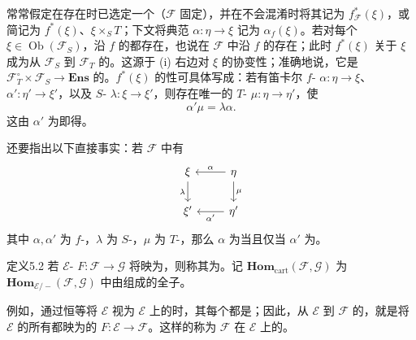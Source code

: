 常常假定在存在时已选定一个（$\mathcal F$ 固定），并在不会混淆时将其记为 $f^*_{\mathcal F}(\xi)$，或简记为 $f^*(\xi)$、$\xi\times_ST$；下文将典范 $\alpha:\eta\to\xi$ 记为 $\alpha_f(\xi)$。若对每个 $\xi\in\operatorname{Ob}(\mathcal F_S)$，沿 $f$ 的都存在，也说在 $\mathcal F$ 中沿 $f$ 的存在；此时 $f^*(\xi)$ 关于 $\xi$ 成为从 $\mathcal F_S$ 到 $\mathcal F_T$ 的。这源于 (i) 右边对 $\xi$ 的协变性；准确地说，它是 $\mathcal F_T^\circ\times\mathcal F_S\to\mathbf{Ens}$ 的。$f^*(\xi)$ 的性可具体写成：若有笛卡尔 $f$- $\alpha:\eta\to\xi$、$\alpha':\eta'\to\xi'$，以及 $S$- $\lambda:\xi\to\xi'$，则存在唯一的 $T$- $\mu:\eta\to\eta'$，使
\[
 \alpha'\mu=\lambda\alpha.
\]
这由 $\alpha'$ 为即得。

还要指出以下直接事实：若 $\mathcal F$ 中有
\[
\begin{tikzcd}
 \xi\arrow[d,"\lambda"']&\eta\arrow[l,"\alpha"']\arrow[d,"\mu"]\\
 \xi'&\eta'\arrow[l,"\alpha'" ]
\end{tikzcd}
\]
其中 $\alpha,\alpha'$ 为 $f$-，$\lambda$ 为 $S$-，$\mu$ 为 $T$-，那么 $\alpha$ 为当且仅当 $\alpha'$ 为。

\begin{SGAresult}{定义}{5.2}
若 $\mathcal E$- $F:\mathcal F\to\mathcal G$ 将映为，则称其为。记 $\mathbf{Hom}_{\mathrm{cart}}(\mathcal F,\mathcal G)$ 为 $\mathbf{Hom}_{\mathcal E/-}(\mathcal F,\mathcal G)$ 中由组成的全子。
\end{SGAresult}
例如，通过恒等将 $\mathcal E$ 视为 $\mathcal E$ 上的时，其每个都是；因此，从 $\mathcal E$ 到 $\mathcal F$ 的，就是将 $\mathcal E$ 的所有都映为的 $F:\mathcal E\to\mathcal F$。这样的称为 $\mathcal F$ 在 $\mathcal E$ 上的。

